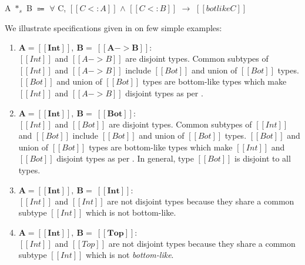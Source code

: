 \begin{definition}
  A $*_s$ B $\Coloneqq$ $\forall$ C, $[[C <: A]]$ $\wedge$ $[[C <: B]]$ $\rightarrow$ $[[botlike C]]$
\label{def:union:disj}
\end{definition}

\noindent We illustrate specifications given in  on few simple examples:

\begin{enumerate}
  \item $\boldsymbol{A = [[Int]], \ B = \ [[A -> B]]:}$ \\
        $[[Int]]$ and $[[A -> B]]$ are disjoint types. Common subtypes of $[[Int]]$ and $[[A -> B]]$ 
        include $[[Bot]]$ and union of $[[Bot]]$ types. $[[Bot]]$ and union of $[[Bot]]$ types are
        bottom-like types which make $[[Int]]$ and $[[A -> B]]$ disjoint types as per .
  \item $\boldsymbol{A = [[Int]], \ B = \ [[Bot]]:}$ \\
        $[[Int]]$ and $[[Bot]]$ are disjoint types. Common subtypes of $[[Int]]$ and $[[Bot]]$ 
        include $[[Bot]]$ and union of $[[Bot]]$ types. $[[Bot]]$ and union of $[[Bot]]$ types are
        bottom-like types which make $[[Int]]$ and $[[Bot]]$ disjoint types as per .
        In general, type $[[Bot]]$ is disjoint to all types.
  \item $\boldsymbol{A = [[Int]], \ B = \ [[Int]]:}$ \\ 
        $[[Int]]$ and $[[Int]]$ are not disjoint types because they share a common subtype $[[Int]]$ which
        is not bottom-like.
  \item $\boldsymbol{A = [[Int]], \ B = \ [[Top]]:}$ \\
        $[[Int]]$ and $[[Top]]$ are not disjoint types because they share a common
        subtype $[[Int]]$ which is not \emph{bottom-like}. 
\end{enumerate}

\begin{comment}
\begin{figure}[t]
  \begin{small}
    \centering
    \drules[ad]{$[[A * B]]$}{Algorithmic Disjointness}{btmr, btml, intl, intr, orl, orr}
  \end{small}
  \caption{Algorithmic Disjointness for \cal.}
  \label{fig:union:ad}
\end{figure}
\end{comment}

